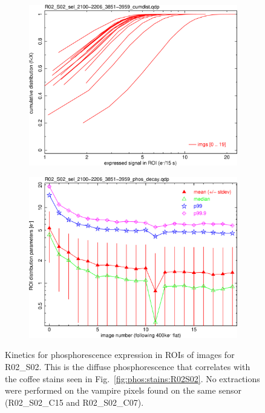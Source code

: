 \begin{figure}[!htbp]
\begin{subfigure}{0.45\textwidth}
  \includegraphics[width=\textwidth]{figures/phosphorescence-survey/phos_kinetics/R02_S02_sel_2100-2206_3851-3959_cumdist.png}    
\end{subfigure}
\hfil
\begin{subfigure}{0.45\textwidth}
  \centering
  \includegraphics[width=\textwidth]{figures/phosphorescence-survey/phos_kinetics/R02_S02_sel_2100-2206_3851-3959_phos_decay.png}
\end{subfigure}
\newline
\caption{Kinetics for phosphorescence expression in ROIs of images for R02\_S02. This is the diffuse phosphorescence that correlates with the coffee stains seen in Fig.~\ref{fig:phos:stains:R02S02}. No extractions were performed on the vampire pixels found on the same sensor (R02\_S02\_C15 and R02\_S02\_C07).}
\label{fig:phos:kinetics:R02S02}
\end{figure}

